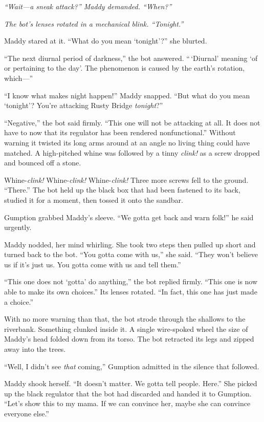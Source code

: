 \documentclass[10pt]{article}
\begin{document}
\emph{``Wait---a sneak attack?'' Maddy demanded. ``When?''}

\emph{The bot's lenses rotated in a mechanical blink. ``Tonight.''}

Maddy stared at it. ``What do you mean `tonight'?'' she blurted.

``The next diurnal period of darkness,'' the bot answered. ``\,`Diurnal'
meaning `of or pertaining to the day'. The phenomenon is caused by the
earth's rotation, which---''

``I know what makes night happen!'' Maddy snapped. ``But what do you
mean `tonight'? You're attacking Rusty Bridge \emph{tonight}?''

``Negative,'' the bot said firmly. ``This one will not be attacking at
all. It does not have to now that its regulator has been rendered
nonfunctional.'' Without warning it twisted its long arms around at an
angle no living thing could have matched. A high-pitched whine was
followed by a tinny \emph{clink!} as a screw dropped and bounced off a
stone.

Whine-\emph{clink!} Whine-\emph{clink!} Whine-\emph{clink!} Three more
screws fell to the ground. ``There.'' The bot held up the black box that
had been fastened to its back, studied it for a moment, then tossed it
onto the sandbar.

Gumption grabbed Maddy's sleeve. ``We gotta get back and warn folk!'' he
said urgently.

Maddy nodded, her mind whirling. She took two steps then pulled up short
and turned back to the bot. ``You gotta come with us,'' she said. ``They
won't believe us if it's just us. You gotta come with us and tell
them.''

``This one does not `gotta' do anything,'' the bot replied firmly.
``This one is now able to make its own choices.'' Its lenses rotated.
``In fact, this one has just made a choice.''

With no more warning than that, the bot strode through the shallows to
the riverbank. Something clunked inside it. A single wire-spoked wheel
the size of Maddy's head folded down from its torso. The bot retracted
its legs and zipped away into the trees.

``Well, I didn't see \emph{that} coming,'' Gumption admitted in the
silence that followed.

Maddy shook herself. ``It doesn't matter. We gotta tell people. Here.''
She picked up the black regulator that the bot had discarded and handed
it to Gumption. ``Let's show this to my mama. If we can convince her,
maybe she can convince everyone else.''
\end{document}
